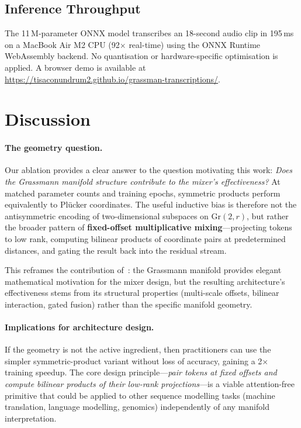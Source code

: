 \documentclass[11pt,a4paper]{article}
\newcommand{\Gr}{\mathrm{Gr}}
\newcommand{\plucker}{Pl\"{u}cker}
\begin{document}
\subsection{Inference Throughput}

The 11\,M-parameter ONNX model transcribes an 18-second audio clip in
195\,ms on a MacBook Air M2 CPU (92$\times$ real-time) using the ONNX
Runtime WebAssembly backend.  No quantisation or hardware-specific
optimisation is applied.  A browser demo is available at
\url{https://tisaconundrum2.github.io/grassman-transcriptions/}.

\section{Discussion}
\label{sec:discussion}

\paragraph{The geometry question.}
Our ablation provides a clear answer to the question motivating this
work: \emph{Does the Grassmann manifold structure contribute to the
mixer's effectiveness?}  At matched parameter counts and training
epochs, symmetric products perform equivalently to \plucker{}
coordinates.  The useful inductive bias is therefore not the
antisymmetric encoding of two-dimensional subspaces on $\Gr(2,r)$, but
rather the broader pattern of \textbf{fixed-offset multiplicative
mixing}---projecting tokens to low rank, computing bilinear products of
coordinate pairs at predetermined distances, and gating the result back
into the residual stream.

This reframes the contribution of~\citet{dong2025attention}: the
Grassmann manifold provides elegant mathematical motivation for the
mixer design, but the resulting architecture's effectiveness stems from
its structural properties (multi-scale offsets, bilinear interaction,
gated fusion) rather than the specific manifold geometry.

\paragraph{Implications for architecture design.}
If the geometry is not the active ingredient, then practitioners can
use the simpler symmetric-product variant without loss of accuracy,
gaining a 2$\times$ training speedup.  The core design
principle---\emph{pair tokens at fixed offsets and compute bilinear
products of their low-rank projections}---is a viable attention-free
primitive that could be applied to other sequence modelling tasks
(machine translation, language modelling, genomics) independently of
any manifold interpretation.
\end{document}
